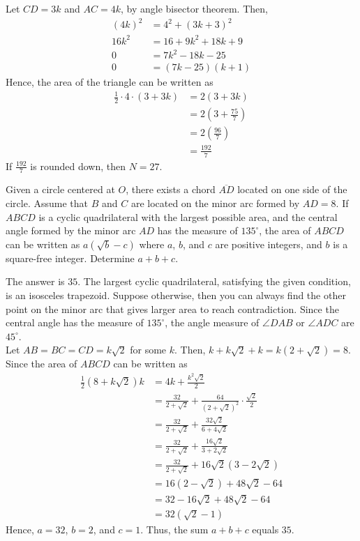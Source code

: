 \begin{solution}
Let $CD=3k$ and $AC=4k$, by angle bisector theorem. Then, 
\begin{align*}
(4k)^2&=4^2+(3k+3)^2\\
16k^2&=16+9k^2+18k+9\\
0&=7k^2-18k-25\\
0&=(7k-25)(k+1)
\end{align*}
Hence, the area of the triangle can be written as 
\begin{align*}
\frac12\cdot4\cdot(3+3k)&=2(3+3k)\\
&=2(3+\frac{75}{7})\\
&=2(\frac{96}{7})\\
&=\frac{192}{7}
\end{align*}
If $\frac{192}{7}$ is rounded down, then $N=27$.
\end{solution}

\begin{problem}
Given a circle centered at $O$, there exists a chord $\overline{AD}$ located on one side of the circle. Assume that $B$ and $C$ are located on the minor arc formed by $AD=8$. If $ABCD$ is a cyclic quadrilateral with the largest possible area, and the central angle formed by the minor arc $AD$ has the measure of $135^\circ$, the area of $ABCD$ can be written as $a(\sqrt{b}-c)$ where $a$, $b$, and $c$ are positive integers, and $b$ is a square-free integer. Determine $a+b+c$.
\end{problem}

\begin{solution}
The answer is $35$. The largest cyclic quadrilateral, satisfying the given condition, is an isosceles trapezoid. Suppose otherwise, then you can always find the other point on the minor arc that gives larger area to reach contradiction. Since the central angle has the measure of $135^\circ$, the angle measure of $\angle DAB$ or $\angle ADC$ are $45^\circ$.\\
\bigskip
Let $AB=BC=CD=k\sqrt{2}$ for some $k$. Then, $k+k\sqrt{2}+k=k(2+\sqrt{2})=8$. Since the area of $ABCD$ can be written as 
\begin{align*}
\frac{1}{2}(8+k\sqrt{2})k&=4k+\frac{k^2\sqrt{2}}{2}\\
&=\frac{32}{2+\sqrt{2}}+\frac{64}{(2+\sqrt{2})^2}\cdot\frac{\sqrt{2}}{2}\\
&=\frac{32}{2+\sqrt{2}}+\frac{32\sqrt{2}}{6+4\sqrt{2}}\\
&=\frac{32}{2+\sqrt{2}}+\frac{16\sqrt{2}}{3+2\sqrt{2}}\\
&=\frac{32}{2+\sqrt{2}}+16\sqrt{2}(3-2\sqrt{2})\\
&=16(2-\sqrt{2})+48\sqrt{2}-64\\
&=32-16\sqrt{2}+48\sqrt{2}-64\\
&=32(\sqrt{2}-1)
\end{align*}
Hence, $a=32$, $b=2$, and $c=1$. Thus, the sum $a+b+c$ equals $35$.
\end{solution}

